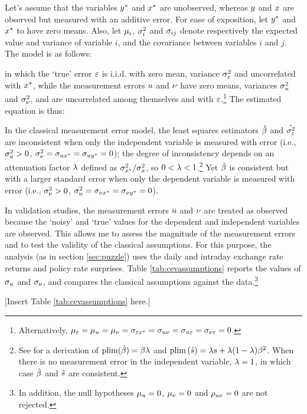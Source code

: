 Let's assume that the variables \(y^{*}\) and \(x^{*}\) are unobserved, whereas \(y\) and \(x\) are observed but measured with an additive error. For ease of exposition, let \(y^{*}\) and \(x^{*}\) to have zero means. Also, let \(\mu_{i}\), \(\sigma^{2}_{i}\) and \(\sigma_{ij}\) denote respectively the expected value and variance of variable \(i\), and the covariance between variables \(i\) and \(j\). 
The model is as follows: 

\noindent in which the `true' error \(\varepsilon\) is i.i.d. with zero mean, variance \(\sigma^{2}_{\varepsilon}\) and uncorrelated with \(x^{*}\), while the measurement errors \(u\) and \(\nu\) have zero means, variances \(\sigma^{2}_{u}\) and \(\sigma^{2}_{\nu}\), and are uncorrelated among themselves and with \(\varepsilon\).\footnote{Alternatively, \(\mu_{\varepsilon} = \mu_{u} = \mu_{\nu} = \sigma_{\varepsilon x^{*}} = \sigma_{u \nu} = \sigma_{u \varepsilon} = \sigma_{\nu \varepsilon} = 0\).} The estimated equation is thus:


In the classical measurement error model, the least squares estimators \(\hat{\beta}\) and \(\hat{\sigma^{2}_{\varepsilon}}\) are inconsistent when only the independent variable is measured with error (i.e., \(\sigma^{2}_{u} > 0\), \(\sigma^{2}_{\nu} = \sigma_{u x^{*}} = \sigma_{u y^{*}} = 0\)); the degree of inconsistency depends on an attenuation factor \(\lambda\) defined as \(\sigma^{2}_{x^{*}} /\sigma^{2}_{x}\), so \(0< \lambda < 1\).\footnote{ See \textcite{Pischke:2007} for a derivation of \(\mathrm{plim} (\hat{\beta}) = \beta \lambda\) and \(\mathrm{plim} \left( \hat{s} \right) = \lambda s + \lambda(1 - \lambda) \beta^{2}\). When there is no measurement error in the independent variable, \(\lambda = 1\), in which case \(\hat{\beta}\) and \(\hat{s}\) are consistent.} Yet \(\hat{\beta}\) is consistent but with a larger standard error when only the dependent variable is measured with error (i.e., \(\sigma^{2}_{\nu} > 0\), \(\sigma^{2}_{u} = \sigma_{\nu x^{*}} = \sigma_{\nu y^{*}} = 0\)). 

In validation studies, the measurement errors \(u\) and \(\nu\) are treated as observed because the `noisy' and `true' values for the dependent and independent variables are observed. This allows me to assess the magnitude of the measurement errors and to test the validity of the classical assumptions. For this purpose, the analysis (as in section \ref{sec:puzzle}) uses the daily and intraday exchange rate returns and policy rate surprises. Table \ref{tab:cevassumptions} reports the values of \(\sigma_{u}\) and \(\sigma_{\nu}\), and compares the classical assumptions against the data.\footnote{In addition, the null hypotheses \(\mu_{u} = 0\), \(\mu_{\nu} = 0\) and \(\rho_{u \nu} = 0\) are not rejected.} 

%
\begin{center}
	[Insert Table \ref{tab:cevassumptions} here.]
\end{center}

